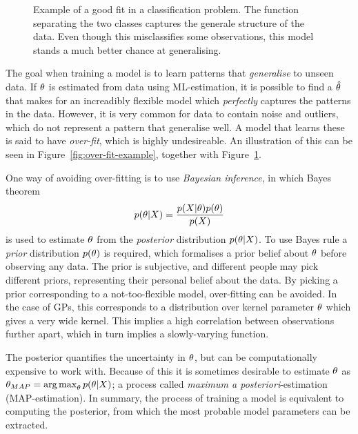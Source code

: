 \begin{figure}
\begin{minipage}{.46\textwidth}
    \caption{Example of a good fit in a classification problem. The
      function separating the two classes captures the generale structure of the
      data. Even though this misclassifies some observations, this
      model stands a much better chance at generalising.}\label{fig:good-fit-example}
  \end{minipage}
\end{figure}

The goal when training a model is to learn patterns that
\textit{generalise} to unseen data. If $\theta$ is estimated
from data using ML-estimation, it is possible to find a $\hat{\theta}$ that
makes for an increadibly flexible model which \textit{perfectly}
captures the patterns in the data. However, it is very common for data
to contain noise and outliers, which do not represent a pattern that
generalise well. A model that learns these is said to have
\textit{over-fit}, which is highly undesireable. An illustration of
this can be seen in Figure~\ref{fig:over-fit-example}, together with Figure~\ref{fig:good-fit-example}.

One way of avoiding over-fitting is to use \textit{Bayesian inference}, in which 
Bayes theorem
\begin{equation}
  \label{eq:bayes}
  p(\theta \vert X) = \frac{p(X \vert \theta) p(\theta)}{p(X)}
\end{equation}
is used to estimate $\theta$ from the \textit{posterior}
distribution $p(\theta \vert X)$. 
To use Bayes rule a \textit{prior} distribution $p(\theta)$ is required, which formalises
a prior belief about $\theta$ before observing any data. The prior is
subjective, and different people may pick different priors,
representing their personal belief about the data. By picking a
prior corresponding to a not-too-flexible model, over-fitting can be
avoided. In the case of GPs, this corresponds to a distribution over kernel
parameter $\theta$ which gives a very wide
kernel. This implies a high correlation between observations further
apart, which in turn implies a slowly-varying function.

The posterior quantifies the uncertainty in $\theta$, but can be computationally
expensive to work with. Because of this it is sometimes desirable to
estimate $\theta$ as $\theta_{MAP} = \operatorname*{arg\,max}_\theta
p (\theta \vert X)$; a process called \textit{maximum a posteriori}-estimation (MAP-estimation).
In summary, the process of training a model is equivalent to computing
the posterior, from which the most probable model parameters can be
extracted. 

